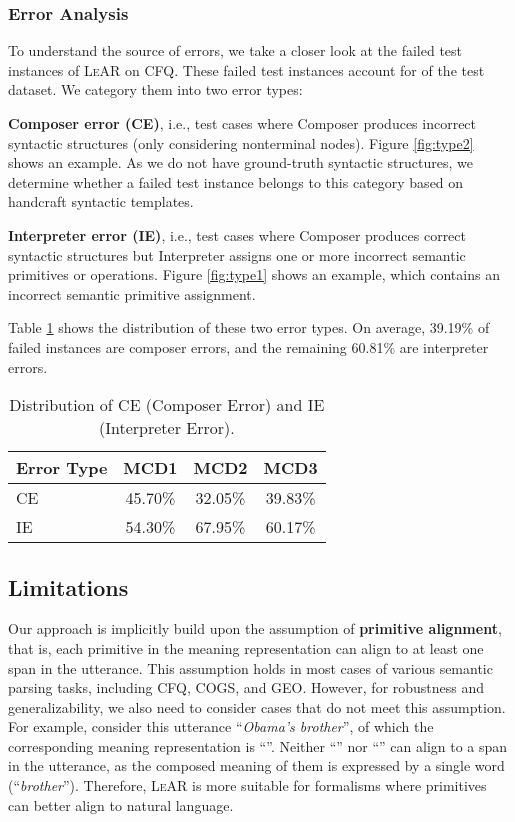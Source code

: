 \documentclass[11pt,a4paper]{article}
\begin{document}
\subsubsection{Error Analysis}

To understand the source of errors, we take a closer look at the failed test instances of \textsc{LeAR} on CFQ.
These failed test instances account for  of the test dataset.
We category them into two error types:

\noindent\textbf{Composer error (CE)}, i.e., test cases where Composer produces incorrect syntactic structures (only considering nonterminal nodes).
Figure \ref{fig:type2} shows an example.
As we do not have ground-truth syntactic structures, we determine whether a failed test instance belongs to this category based on handcraft syntactic templates.

\noindent\textbf{Interpreter error (IE)}, i.e., test cases where Composer produces correct syntactic structures but Interpreter assigns one or more incorrect semantic primitives or operations.
Figure \ref{fig:type1} shows an example, which contains an incorrect semantic primitive assignment.


Table \ref{tab:err_type} shows the distribution of these two error types.
On average, 39.19\% of failed instances are composer errors, and the remaining 60.81\% are interpreter errors.

\begin{table}
\centering
\begin{tabular}{lccc}
\hline \textbf{Error Type} & \textbf{MCD1} & \textbf{MCD2} & \textbf{MCD3} \\ \hline
CE & 45.70\% & 32.05\% & 39.83\% \\
IE & 54.30\% & 67.95\% & 60.17\% \\
\hline
\end{tabular}
\caption{Distribution of CE (Composer Error) and IE (Interpreter Error). }
\label{tab:err_type}
\end{table}





\subsection{Limitations}

Our approach is implicitly build upon the assumption of \textbf{primitive alignment}, that is, each primitive in the meaning representation can align to at least one span in the utterance.
This assumption holds in most cases of various semantic parsing tasks, including CFQ, COGS, and GEO.
However, for robustness and generalizability, we also need to consider cases that do not meet this assumption.
For example, consider this utterance ``\textit{Obama's brother}'', of which the corresponding meaning representation is ``''.
Neither ``'' nor ``'' can align to a span in the utterance, as the composed meaning of them is expressed by a single word (``\textit{brother}'').
Therefore, \textsc{LeAR} is more suitable for formalisms where primitives can better align to natural language.
\end{document}
